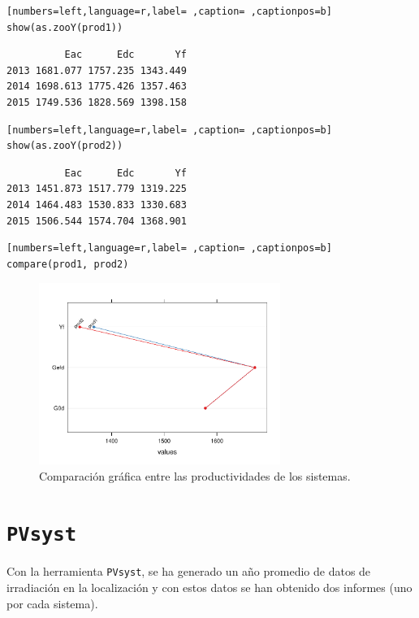 \begin{lstlisting}[numbers=left,language=r,label= ,caption= ,captionpos=b]
show(as.zooY(prod1))
\end{lstlisting}

\begin{verbatim}
          Eac      Edc       Yf
2013 1681.077 1757.235 1343.449
2014 1698.613 1775.426 1357.463
2015 1749.536 1828.569 1398.158
\end{verbatim}


\begin{lstlisting}[numbers=left,language=r,label= ,caption= ,captionpos=b]
show(as.zooY(prod2))
\end{lstlisting}

\begin{verbatim}
          Eac      Edc       Yf
2013 1451.873 1517.779 1319.225
2014 1464.483 1530.833 1330.683
2015 1506.544 1574.704 1368.901
\end{verbatim}


\begin{lstlisting}[numbers=left,language=r,label= ,caption= ,captionpos=b]
compare(prod1, prod2)
\end{lstlisting}

\begin{figure}[htbp]
\centering
\includegraphics[width=0.7\textwidth]{figuras/ejemplos2.pdf}
\caption{Comparación gráfica entre las productividades de los sistemas.}
\end{figure}


\section{\texttt{PVsyst}}
\label{sec:org520b683}
Con la herramienta \texttt{PVsyst}, se ha generado un año promedio de datos de irradiación en la localización y con estos datos se han obtenido dos informes (uno por cada sistema).

